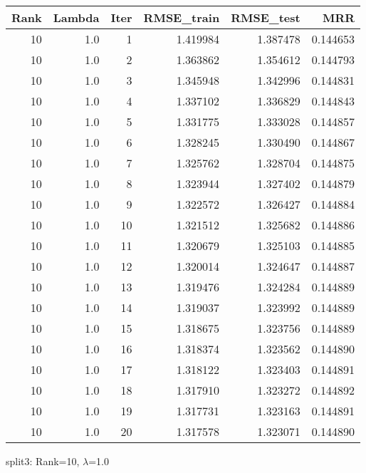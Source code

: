 \begin{tabular}{rrrrrr}
\toprule
 Rank &  Lambda &  Iter &  RMSE\_train &  RMSE\_test &       MRR \\
\midrule
   10 &     1.0 &     1 &    1.419984 &   1.387478 &  0.144653 \\
   10 &     1.0 &     2 &    1.363862 &   1.354612 &  0.144793 \\
   10 &     1.0 &     3 &    1.345948 &   1.342996 &  0.144831 \\
   10 &     1.0 &     4 &    1.337102 &   1.336829 &  0.144843 \\
   10 &     1.0 &     5 &    1.331775 &   1.333028 &  0.144857 \\
   10 &     1.0 &     6 &    1.328245 &   1.330490 &  0.144867 \\
   10 &     1.0 &     7 &    1.325762 &   1.328704 &  0.144875 \\
   10 &     1.0 &     8 &    1.323944 &   1.327402 &  0.144879 \\
   10 &     1.0 &     9 &    1.322572 &   1.326427 &  0.144884 \\
   10 &     1.0 &    10 &    1.321512 &   1.325682 &  0.144886 \\
   10 &     1.0 &    11 &    1.320679 &   1.325103 &  0.144885 \\
   10 &     1.0 &    12 &    1.320014 &   1.324647 &  0.144887 \\
   10 &     1.0 &    13 &    1.319476 &   1.324284 &  0.144889 \\
   10 &     1.0 &    14 &    1.319037 &   1.323992 &  0.144889 \\
   10 &     1.0 &    15 &    1.318675 &   1.323756 &  0.144889 \\
   10 &     1.0 &    16 &    1.318374 &   1.323562 &  0.144890 \\
   10 &     1.0 &    17 &    1.318122 &   1.323403 &  0.144891 \\
   10 &     1.0 &    18 &    1.317910 &   1.323272 &  0.144892 \\
   10 &     1.0 &    19 &    1.317731 &   1.323163 &  0.144891 \\
   10 &     1.0 &    20 &    1.317578 &   1.323071 &  0.144890 \\
\bottomrule
\end{tabular}

\caption{split3: Rank=10, $\lambda$=1.0}
